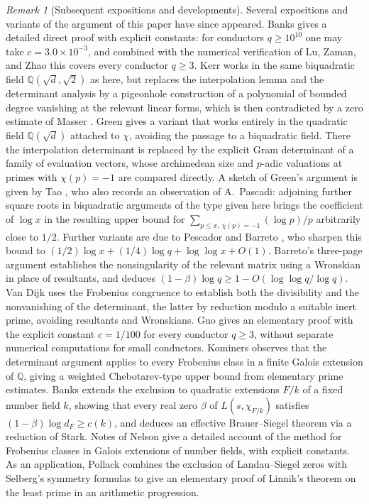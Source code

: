 \documentclass[11pt,a4paper]{amsart}
\theoremstyle{remark}
\newtheorem*{remark*}{Remark}
\newcommand{\Q}{\mathbb Q}
\numberwithin{equation}{section}
\begin{document}
\begin{remark*}[Subsequent expositions and developments]
Several expositions and variants of the argument of this paper have
since appeared. Banks \cite{Banks} gives a detailed direct proof with
explicit constants: for conductors $q\ge10^{10}$ one may take
$c=3.0\times10^{-3}$, and combined with the numerical verification of
Lu, Zaman, and Zhao \cite{LZZ} this covers every conductor $q\ge3$.
Kerr \cite{Kerr} works in the same biquadratic field
$\Q(\sqrt{d},\sqrt{2})$ as here, but replaces the interpolation lemma and the
determinant analysis by a pigeonhole construction of a polynomial of
bounded degree vanishing at the relevant linear forms, which is then
contradicted by a zero estimate of Masser \cite{Masser}. Green
\cite{Green} gives a variant that works entirely in the quadratic field
$\Q(\sqrt{d})$ attached to $\chi$, avoiding the passage to a biquadratic
field. There the interpolation determinant is replaced by the explicit
Gram determinant of a family of evaluation vectors, whose archimedean
size and $p$-adic valuations at primes with $\chi(p)=-1$ are compared
directly. A sketch of Green's argument is given by Tao \cite{TaoBlog},
who also records an observation of A.~Pascadi: adjoining further square
roots in biquadratic arguments of the type given here brings the
coefficient of $\log x$ in the resulting upper bound for
$\sum_{p\le x,\ \chi(p)=-1}(\log p)/p$ arbitrarily close to $1/2$.
Further variants are due to Pescador \cite{Pescador} and Barreto
\cite{Barreto}, who sharpen this bound to
$(1/2)\log x+(1/4)\log q+\log\log x+O(1)$. Barreto's three-page
argument establishes the nonsingularity of the relevant matrix using a
Wronskian in place of resultants, and deduces
$(1-\beta)\log q\ge1-O(\log\log q/\log q)$. Van Dijk \cite{vanDijk}
uses the Frobenius congruence to establish both the divisibility and
the nonvanishing of the determinant, the latter by reduction modulo a
suitable inert prime, avoiding resultants and Wronskians. Guo
\cite{Guo} gives an elementary proof with the explicit constant
$c=1/100$ for every conductor $q\ge3$, without separate numerical
computations for small conductors. Kominers \cite{Kominers} observes
that the determinant argument applies to every Frobenius class in a
finite Galois extension of $\Q$, giving a weighted Chebotarev-type
upper bound from elementary prime estimates. Banks \cite{Banks2}
extends the exclusion to quadratic extensions $F/k$ of a fixed number
field $k$, showing that every real zero $\beta$ of $L(s,\chi_{F/k})$
satisfies $(1-\beta)\log d_F\ge c(k)$, and deduces an effective
Brauer--Siegel theorem via a reduction of Stark. Notes of Nelson
\cite{Nelson} give a detailed account of the method for Frobenius
classes in Galois extensions of number fields, with explicit constants.
As an application, Pollack \cite{Pollack} combines the exclusion of
Landau--Siegel zeros with Selberg's symmetry formulas to give an
elementary proof of Linnik's theorem on the least prime in an
arithmetic progression.
\end{remark*}
\end{document}
